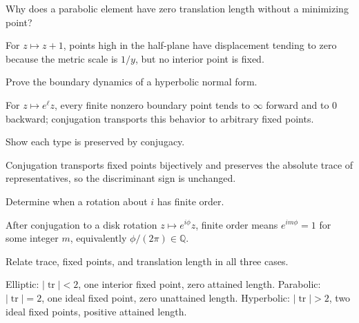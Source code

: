 \begin{problem}\label{prob:vii34-08}
Why does a parabolic element have zero translation length without a minimizing point?
\end{problem}
\begin{solution}
For \(z\mapsto z+1\), points high in the half-plane have displacement tending to zero because the metric scale is \(1/y\), but no interior point is fixed.
\end{solution}

\begin{problem}\label{prob:vii34-09}
Prove the boundary dynamics of a hyperbolic normal form.
\end{problem}
\begin{solution}
For \(z\mapsto e^\ell z\), every finite nonzero boundary point tends to \(\infty\) forward and to \(0\) backward; conjugation transports this behavior to arbitrary fixed points.
\end{solution}

\begin{problem}\label{prob:vii34-10}
Show each type is preserved by conjugacy.
\end{problem}
\begin{solution}
Conjugation transports fixed points bijectively and preserves the absolute trace of representatives, so the discriminant sign is unchanged.
\end{solution}

\begin{problem}\label{prob:vii34-11}
Determine when a rotation about \(i\) has finite order.
\end{problem}
\begin{solution}
After conjugation to a disk rotation \(z\mapsto e^{i\phi}z\), finite order means \(e^{im\phi}=1\) for some integer \(m\), equivalently \(\phi/(2\pi)\in\mathbb Q\).
\end{solution}

\begin{problem}\label{prob:vii34-12}
Relate trace, fixed points, and translation length in all three cases.
\end{problem}
\begin{solution}
Elliptic: \(|\operatorname{tr}|<2\), one interior fixed point, zero attained length. Parabolic: \(|\operatorname{tr}|=2\), one ideal fixed point, zero unattained length. Hyperbolic: \(|\operatorname{tr}|>2\), two ideal fixed points, positive attained length.
\end{solution}

